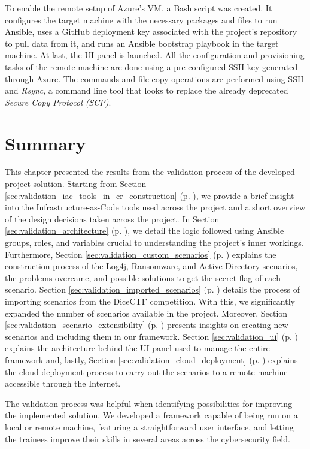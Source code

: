 To enable the remote setup of Azure's VM, a Bash script was created. It configures the target machine with the necessary packages and files to run Ansible, uses a GitHub deployment key associated with the project's repository to pull data from it, and runs an Ansible bootstrap playbook in the target machine. At last, the UI panel is launched. All the configuration and provisioning tasks of the remote machine are done using a pre-configured SSH key generated through Azure. The commands and file copy operations are performed using SSH and \textit{Rsync}, a command line tool that looks to replace the already deprecated \textit{Secure Copy Protocol (SCP)}.


\section{Summary} \label{sec:validation_summary}

This chapter presented the results from the validation process of the developed project solution. Starting from Section \ref{sec:validation_iac_tools_in_cr_construction} (p. \pageref{sec:validation_iac_tools_in_cr_construction}), we provide a brief insight into the Infrastructure-as-Code tools used across the project and a short overview of the design decisions taken across the project. In Section \ref{sec:validation_architecture} (p. \pageref{sec:validation_architecture}), we detail the logic followed using Ansible groups, roles, and variables crucial to understanding the project's inner workings. Furthermore, Section \ref{sec:validation_custom_scenarios} (p. \pageref{sec:validation_custom_scenarios}) explains the construction process of the Log4j, Ransomware, and Active Directory scenarios, the problems overcame, and possible solutions to get the secret flag of each scenario. Section \ref{sec:validation_imported_scenarios} (p. \pageref{sec:validation_imported_scenarios}) details the process of importing scenarios from the DiceCTF competition. With this, we significantly expanded the number of scenarios available in the project. Moreover, Section \ref{sec:validation_scenario_extensibility} (p. \pageref{sec:validation_scenario_extensibility}) presents insights on creating new scenarios and including them in our framework. Section \ref{sec:validation_ui} (p. \pageref{sec:validation_ui}) explains the architecture behind the UI panel used to manage the entire framework and, lastly, Section \ref{sec:validation_cloud_deployment} (p. \pageref{sec:validation_cloud_deployment}) explains the cloud deployment process to carry out the scenarios to a remote machine accessible through the Internet.

The validation process was helpful when identifying possibilities for improving the implemented solution. We developed a framework capable of being run on a local or remote machine, featuring a straightforward user interface, and letting the trainees improve their skills in several areas across the cybersecurity field.